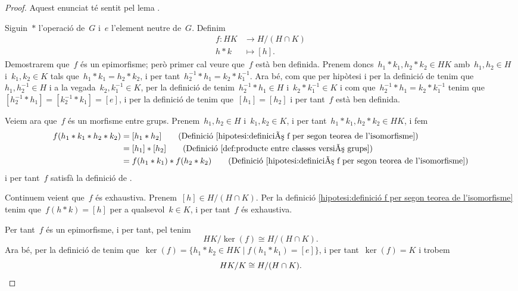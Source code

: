 \documentclass[../../main.tex]{subfiles}
\begin{document}
    \begin{proof}
        Aquest enunciat té sentit pel lema .

        Siguin~\(\ast\) l'operació de~\(G\) i~\(e\) l'element neutre de~\(G\).
        Definim
        \begin{align}\label{hipotesi:definició f per segon teorea de l'isomorfisme}
        f\colon HK&\longrightarrow H/(H\cap K)\\
        h\ast k&\longmapsto [h].\nonumber
        \end{align}
        Demostrarem que~\(f\) és un epimorfisme; però primer cal veure que~\(f\) està ben definida.
        Prenem doncs~\(h_{1}\ast k_{1},h_{2}\ast k_{2}\in HK\) amb~\(h_{1},h_{2}\in H\) i~\(k_{1},k_{2}\in K\) tals que~\(h_{1}\ast k_{1}=h_{2}\ast k_{2}\), i per tant~\(h_{2}^{-1}\ast h_{1}=k_{2}\ast k_{1}^{-1}\).
        Ara bé, com que per hipòtesi i per la definició de  tenim que~\(h_{1},h_{2}^{-1}\in H\) i a la vegada~\(k_{2},k_{1}^{-1}\in K\), per la definició de  tenim~\(h_{2}^{-1}\ast h_{1}\in H\) i~\(k_{2}\ast k_{1}^{-1}\in K\) i com que~\(h_{2}^{-1}\ast h_{1}=k_{2}\ast k_{1}^{-1}\) tenim que~\([h_{2}^{-1}\ast h_{1}]=[k_{2}^{-1}\ast k_{1}]=[e]\), i per la definició de  %
        tenim que~\([h_{1}]=[h_{2}]\) i per tant~\(f\) està ben definida.

        Veiem ara que~\(f\) és un morfisme entre grups.
        Prenem~\(h_{1},h_{2}\in H\) i~\(k_{1},k_{2}\in K\), i per tant~\(h_{1}\ast k_{1},h_{2}\ast k_{2}\in HK\), i fem
        \begin{align*}
        f(h_{1}\ast k_{1}\ast h_{2}\ast k_{2})&=[h_{1}\ast h_{2}]\tag{Definició \eqref{hipotesi:definició f per segon teorea de l'isomorfisme}}\\
        &=[h_{1}]\ast[h_{2}]\tag{Definició \eqref{def:producte entre classes versió grups}}\\
        &=f(h_{1}\ast k_{1})\ast f(h_{2}\ast k_{2})\tag{Definició \eqref{hipotesi:definició f per segon teorea de l'isomorfisme}}
        \end{align*}
        i per tant~\(f\) satisfà la definició de .

        Continuem veient que~\(f\) és exhaustiva.
        Prenem~\([h]\in H/(H\cap K)\).
        Per la definició \eqref{hipotesi:definició f per segon teorea de l'isomorfisme} tenim que~\(f(h\ast k)=[h]\) per a qualsevol~\(k\in K\), i per tant~\(f\) és exhaustiva.

        Per tant~\(f\) és un epimorfisme, i per tant, pel  tenim
        \[
            HK/\ker(f)\cong H/(H\cap K).
        \]
        Ara bé, per la definició de  tenim que~\(\ker(f)=\{h_{1}\ast k_{2}\in HK\mid f(h_{1}\ast k_{1})=[e]\}\), i per tant~\(\ker(f)=K\) i trobem
        \[
            HK/K\cong H/(H\cap K).\qedhere
        \]
    \end{proof}
\end{document}
